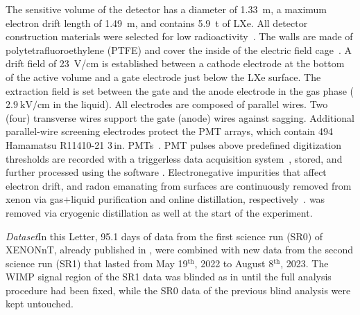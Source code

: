 \documentclass[
    reprint,
    superscriptaddress,
    aps, prl,
    amsmath,amssymb,
    twocolumn,
    showkeys,
    floatfix,
    nofootinbib,
]{revtex4-2}
\begin{document}
The sensitive volume of the detector has a diameter of \SI{1.33}{m}, a maximum electron drift length of \SI{1.49}{m}, and contains \SI{5.9}{\tonne} of LXe.
All detector construction materials were selected for low radioactivity~\cite{XENON:2021radiopurity}.
The walls are made of polytetrafluoroethylene (PTFE) and cover the inside of the electric field cage~\cite{XENONnT:2023field}.
A drift field of \SI{23}{\volt/\cm} is established between a cathode electrode at the bottom of the active volume and a gate electrode just below the LXe surface.
The extraction field is set between the gate and the anode electrode in the gas phase ($\SI{2.9}{\kilo\volt/\cm}$ in the liquid).
All electrodes are composed of parallel wires.
Two (four) transverse wires support the gate (anode) wires against sagging.
Additional parallel-wire screening electrodes protect the PMT arrays, which contain 494 Hamamatsu R11410-21 $3\,\mathrm{in.}$ PMTs~\cite{Antochi:2021pmt}.
PMT pulses above predefined digitization thresholds are recorded with a triggerless data acquisition system~\cite{XENON:2023daq}, stored, and further processed using the software  \cite{strax,straxen}.
Electronegative impurities that affect electron drift, and radon emanating from surfaces are continuously removed from xenon via gas+liquid purification and online distillation, respectively~\cite{XENON:2024liquidpurification, Plante:2022khm, Murra:2022mlr, XENON:2024instr}.
 was removed via cryogenic distillation as well at the start of the experiment.


\textit{Dataset\textemdash}In this Letter, 95.1 days of data from the first science run (SR0) of XENONnT, already published in \cite{XENON:2023wimp}, were combined with new data from the second science run (SR1) that lasted from May 19$^{\text{th}}$, 2022 to August 8$^{\text{th}}$, 2023.
The WIMP signal region of the SR1 data was blinded as in \cite{XENON:2023wimp} until the full analysis procedure had been fixed, while the SR0 data of the previous blind analysis were kept untouched.
\end{document}
